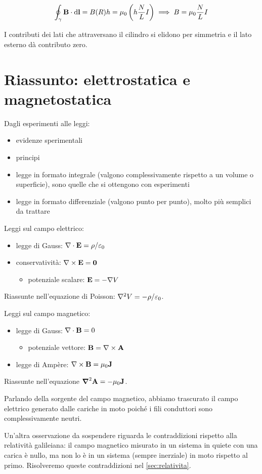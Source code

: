 \begin{equation}
    \oint_\gamma \mathbf{B} \cdot \mathrm{d} \mathbf{l} = B(R) h = \mu_0 \left( h \frac{N}{L} I \right) \implies B = \mu_0 \frac{N}{L} I
\end{equation}

I contributi dei lati che attraversano il cilindro si elidono per simmetria e il lato esterno dà contributo zero.

\section{Riassunto: elettrostatica e magnetostatica}

Dagli esperimenti alle leggi:
\begin{itemize}
    \item evidenze sperimentali
    \item principi
    \item legge in formato integrale (valgono complessivamente rispetto a un volume o superficie), sono quelle che si ottengono con esperimenti
    \item legge in formato differenziale (valgono punto per punto), molto più semplici da trattare
\end{itemize}

Leggi sul campo elettrico:
\begin{itemize}
    \item legge di Gauss: $\nabla \cdot \mathbf{E} = \rho/\varepsilon_0$
    \item conservatività: $\nabla \times \mathbf{E} = \mathbf{0}$
    \begin{itemize}
        \item potenziale scalare: $\mathbf{E} = -\nabla V$
    \end{itemize}
\end{itemize}
Riassunte nell'equazione di Poisson: $\nabla^2 V = -\rho/\varepsilon_0$.

Leggi sul campo magnetico:
\begin{itemize}
    \item legge di Gauss: $\nabla \cdot \mathbf{B} = 0$
    \begin{itemize}
        \item potenziale vettore: $\mathbf{B} = \nabla \times \mathbf{A}$
    \end{itemize}
    \item legge di Ampère: $\nabla \times \mathbf{B} = \mu_0 \mathbf{J}$
\end{itemize}
Riassunte nell'equazione $\boldsymbol{\nabla}^2 \mathbf{A} = -\mu_0 \mathbf{J}$.

Parlando della sorgente del campo magnetico, abbiamo trascurato il campo elettrico generato dalle cariche in moto poiché i fili conduttori sono complessivamente neutri.

Un'altra osservazione da sospendere riguarda le contraddizioni rispetto alla relatività galileiana: il campo magnetico misurato in un sistema in quiete con una carica è nullo, ma non lo è in un sistema (sempre inerziale) in moto rispetto al primo. Risolveremo queste contraddizioni nel \autoref{sec:relativita}.
